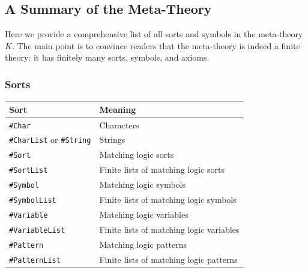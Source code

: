 \documentclass[UTF8,11pt]{article}
\theoremstyle{plain}
\theoremstyle{definition}
\theoremstyle{remark}
\newcommand{\sharpsymbol}{\#}
\newcommand{\KChar}{\texttt{\sharpsymbol Char}}
\newcommand{\KCharList}{\texttt{\sharpsymbol CharList}}
\newcommand{\KString}{\texttt{\sharpsymbol String}}
\newcommand{\KSort}{\texttt{\sharpsymbol Sort}}
\newcommand{\KSymbol}{\texttt{\sharpsymbol Symbol}}
\newcommand{\KPatternList}{\texttt{\sharpsymbol PatternList}}
\newcommand{\KSortList}{\texttt{\sharpsymbol SortList}}
\newcommand{\KSymbolList}{\texttt{\sharpsymbol SymbolList}}
\newcommand{\KVariableList}{\texttt{\sharpsymbol VariableList}}
\newcommand{\KVariable}{\texttt{\sharpsymbol Variable}}
\newcommand{\KPattern}{\texttt{\sharpsymbol Pattern}}
\begin{document}
\subsection{A Summary of the Meta-Theory}
\label{sec:K-summary}
Here we provide a comprehensive list of all sorts and symbols in the 
meta-theory $K$.
The main point is to convince readers that the meta-theory is indeed a finite 
theory: it has finitely many sorts, symbols, and axioms.

\subsubsection{Sorts}

\begin{center}
	\begin{tabular}{l|l}
		\textbf{Sort} & \textbf{Meaning} \\
		\hline
		\KChar & Characters \\
		{\KCharList} or \KString & Strings \\
		\KSort & Matching logic sorts \\
		\KSortList & Finite lists of matching logic sorts \\
		\KSymbol & Matching logic symbols \\
		\KSymbolList & Finite lists of matching logic symbols \\
		\KVariable & Matching logic variables \\
		\KVariableList & Finite lists of matching logic variables \\
		\KPattern & Matching logic patterns \\
		\KPatternList & Finite lists of matching logic patterns \\
	\end{tabular}
\end{center}
\end{document}
